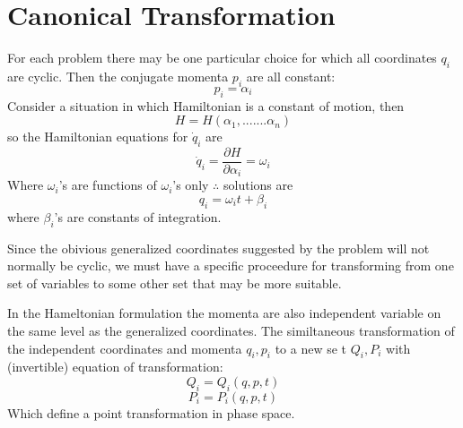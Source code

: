 \chapter{Canonical Transformation}
For each problem there may be one particular choice for which all coordinates $q_i$ are cyclic. Then the conjugate momenta $p_i$ are all constant:
$$p_i=\alpha_i$$
Consider a situation in which Hamiltonian is a constant of motion,
then 
$$H=H(\alpha_1,.......\alpha_n)$$
so the Hamiltonian equations for $\dot{q}_i$ are 
$$\dot{q}_i=\frac{\partial H}{\partial \alpha_i}=\omega_i$$
Where $\omega_i$'s are functions of $\omega_i$'s only 
$\therefore $ solutions are
$$ q_i=\omega_i t+\beta_i$$
where $\beta_i$'s are constants of integration.\\
\par Since the obivious generalized coordinates suggested by the problem will
not normally be cyclic, we must have a specific proceedure for transforming from one set of variables to some other set that may be more suitable.\\
\par In the Hameltonian formulation the momenta are also independent variable on the same level as the generalized coordinates. The similtaneous transformation of the independent coordinates and momenta $q_i,p_i$ to a new se t  $Q_i,P_i$ with (invertible) equation of transformation:
$$Q_i=Q_i (q,p,t)$$
$$P_i=P_i (q,p,t)$$
Which define a point transformation in phase space.
